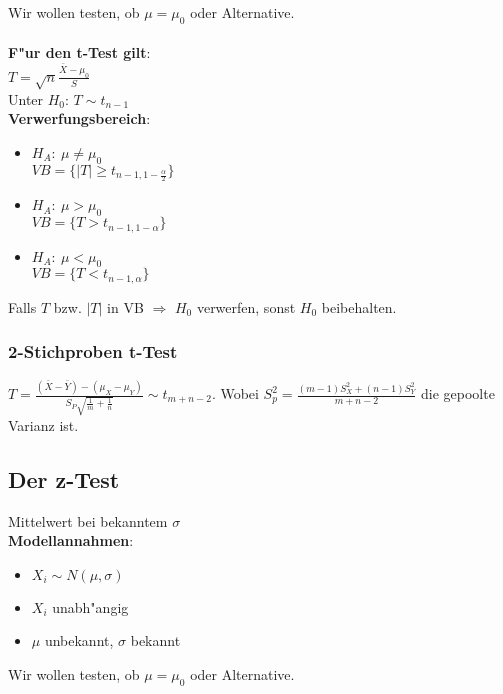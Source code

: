 \documentclass[10pt, a4paper, twocolumn]{scrartcl}
\begin{document}
Wir wollen testen, ob $\mu=\mu_0$ oder Alternative.\\\\

\textbf{F"ur den t-Test gilt}:\\
$T=\sqrt{n}\frac{\bar{X}-\mu_0}{S}$\\

Unter $H_0$: $T\sim t_{n-1}$\\

\textbf{Verwerfungsbereich}:
\begin{itemize}
 \item $H_A:\:\mu\neq\mu_0$\\
  $VB=\{\mid T \mid \geq t_{n-1,1-\frac{\alpha}{2}}\}$
 \item $H_A:\:\mu>\mu_0$\\
  $VB=\{T > t_{n-1,1-\alpha}\}$
 \item $H_A:\:\mu<\mu_0$\\
  $VB=\{T < t_{n-1,\alpha}\}$
\end{itemize}

Falls $T$ bzw. $|T|$ in VB $\Rightarrow$ $H_0$ verwerfen, sonst $H_0$ beibehalten.


\subsubsection{2-Stichproben t-Test}

$T=\frac{(\bar{X}-\bar{Y})-(\mu_X-\mu_Y)}{S_P\sqrt{\frac{1}{m}+\frac{1}{n}}}\sim t_{m+n-2}$. Wobei $S_p^2=\frac{(m-1)S_X^2+(n-1)S_Y^2}{m+n-2}$ die gepoolte Varianz ist.\\

\subsection{Der z-Test}

Mittelwert bei bekanntem $\sigma$\\

\textbf{Modellannahmen}:
\begin{itemize}
 \item $X_i \sim N(\mu,\sigma)$
 \item $X_i$ unabh"angig
 \item $\mu$ unbekannt, $\sigma$ bekannt
\end{itemize}

Wir wollen testen, ob $\mu=\mu_0$ oder Alternative.\\\\
\end{document}
